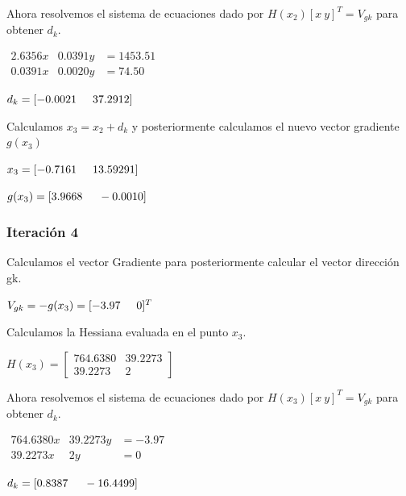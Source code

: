 \documentclass[12pt]{article}
\begin{document}
	Ahora resolvemos el sistema de ecuaciones dado por $H(x_2)[x\ y]^T=V_{gk}$ para obtener $d_k$.
	
	\begin{center}
		$\begin{array}{ccc}
			2.6356x & 0.0391y & =1453.51\\
			0.0391x & 0.0020y & =74.50
		\end{array}$
		
		$d_k=[-0.0021 \hspace{0.5cm} 37.2912]$
	\end{center}	
	
	Calculamos $x_3=x_2+d_k$ y posteriormente calculamos el nuevo vector gradiente $g(x_3)$
	
	\begin{center}
		$x_3=[-0.7161\hspace{0.5cm}13.59291]$
		
		$g(x_3)=[3.9668\hspace{0.5cm}-0.0010]$
	\end{center}

    \subsubsection*{Iteración 4}
	
	Calculamos el vector Gradiente para posteriormente calcular el vector dirección gk.
	
	\begin{center}
		$V_{gk}=-g(x_3)=[-3.97 \hspace{0.5cm} 0]^T$			
	\end{center}
	
	Calculamos la Hessiana evaluada en el punto $x_3$.
	
	\begin{center}
		$H(x_3)=\left[\begin{array}{cc}
			764.6380  &  39.2273\\
			39.2273   & 2
		\end{array}\right]$		
	\end{center}
	
	Ahora resolvemos el sistema de ecuaciones dado por $H(x_3)[x\ y]^T=V_{gk}$ para obtener $d_k$.
	
	\begin{center}
		$\begin{array}{ccc}
			764.6380x &39.2273y & =-3.97\\
			39.2273x & 2y & =0
		\end{array}$
		
		$d_k=[0.8387  \hspace{0.5cm} -16.4499]$
	\end{center}	
	
\end{document}
